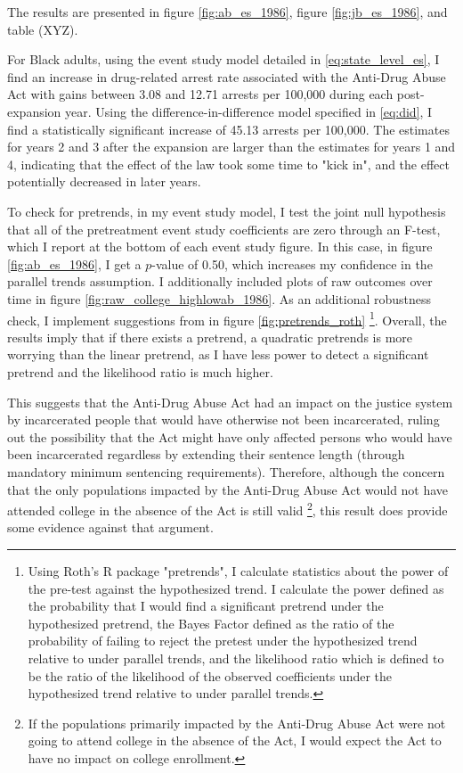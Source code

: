 \documentclass{article}
\begin{document}
The results are presented in figure \ref{fig:ab_es_1986}, figure \ref{fig:jb_es_1986}, and table (XYZ). 

For Black adults, using the event study model detailed in \ref{eq:state_level_es}, I find an increase in drug-related arrest rate associated with the Anti-Drug Abuse Act with gains between 3.08 and 12.71 arrests per 100,000 during each post-expansion year. Using the difference-in-difference model specified in \ref{eq:did}, I find a statistically significant increase of 45.13 arrests per 100,000. The estimates for years 2 and 3 after the expansion are larger than the estimates for years 1 and 4, indicating that the effect of the law took some time to "kick in", and the effect potentially decreased in later years.

To check for pretrends, in my event study model, I test the joint null hypothesis that all of the pretreatment event study coefficients are zero through an F-test, which I report at the bottom of each event study figure. In this case, in figure \ref{fig:ab_es_1986}, I get a $p$-value of 0.50, which increases my confidence in the parallel trends assumption. I additionally included plots of raw outcomes over time in figure  \ref{fig:raw_college_highlowab_1986}. As an additional robustness check, I implement suggestions from \cite{roth2022} in figure \ref{fig:pretrends_roth} \footnote{Using Roth's R package "pretrends", I calculate statistics about the power of the pre-test against the hypothesized trend. I calculate the power defined as the probability that I would find a significant pretrend under the hypothesized pretrend, the Bayes Factor defined as the ratio of the probability of failing to reject the pretest under the hypothesized trend relative to under parallel trends, and the likelihood ratio which is defined to be the ratio of the likelihood of the observed coefficients under the hypothesized trend relative to under parallel trends.}. Overall, the results imply that if there exists a pretrend, a quadratic pretrends is more worrying than the linear pretrend, as I have less power to detect a significant pretrend and the likelihood ratio is much higher.

This suggests that the Anti-Drug Abuse Act had an impact on the justice system by incarcerated people that would have otherwise not been incarcerated, ruling out the possibility that the Act might have only affected persons who would have been incarcerated regardless by extending their sentence length (through mandatory minimum sentencing requirements). Therefore, although the concern that the only populations impacted by the Anti-Drug Abuse Act would not have attended college in the absence of the Act is still valid \footnote{If the populations primarily impacted by the Anti-Drug Abuse Act were not going to attend college in the absence of the Act, I would expect the Act to have no impact on college enrollment.}, this result does provide some evidence against that argument.
\end{document}
